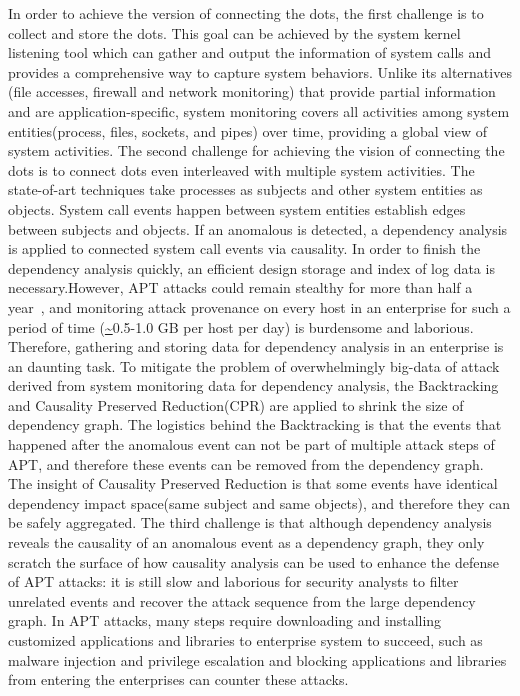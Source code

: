 In order to achieve the version of connecting the dots, the first challenge is to collect and store the dots. This goal can be achieved by the system kernel listening tool which can gather and output the information of system calls and provides a comprehensive way to capture system behaviors\cite{backtracking,backtracking2}. Unlike its alternatives (file accesses, firewall and network monitoring) that provide partial  information and are application-specific, system monitoring covers all activities among system entities(process, files, sockets, and pipes) over time, providing a global view of system activities.
The second challenge for achieving the vision of connecting the dots is to connect dots even interleaved with multiple system activities. The state-of-art\cite{taser,backtracking,backtracking2} techniques take processes as subjects and other system entities as objects. System call events happen between system entities establish edges between subjects and objects. If an anomalous is detected, a dependency analysis is applied to  connected system call events via causality. In order to finish the dependency analysis quickly, an efficient design storage and index of log data is necessary.However, APT attacks could remain stealthy for more than half a year~\cite{trustwave}, and monitoring attack provenance on every host in an enterprise for such a period of time (\url{~}0.5-1.0 GB per host per day) is burdensome and laborious. Therefore, gathering and storing data for dependency analysis in an enterprise is an daunting task. To mitigate the problem of overwhelmingly big-data of attack derived from system monitoring data for dependency analysis, the Backtracking and Causality Preserved Reduction(CPR) are applied to shrink the size of dependency graph.
The logistics behind the Backtracking is that the events that happened after the anomalous event can not be part of multiple attack steps of APT, and therefore these events can be removed from the dependency graph. The insight of Causality Preserved Reduction is that some events have identical dependency impact space(same subject and same objects), and therefore they can be safely aggregated.
The third challenge is that although dependency analysis reveals the causality of an anomalous event as a dependency graph, they only scratch the surface of how causality analysis can be used to enhance the defense of APT attacks: it is still slow and laborious for security analysts to filter unrelated events and recover the attack sequence from the large dependency graph. In APT attacks, many steps require downloading and installing customized applications and libraries to enterprise system to succeed, such as malware injection and privilege escalation\cite{apt,aptmalware,defendapt} and blocking applications and libraries from entering the enterprises can counter these attacks. 
